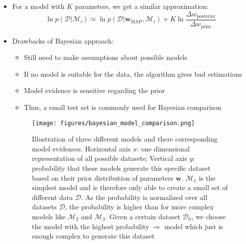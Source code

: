\begin{itemize}
	 \item For a model with $K$ parameters, we get a similar approximation: 
	 $$\ln p\left(\mathcal{D}|\mathcal{M}_i\right) \simeq \ln p\left(\mathcal{D}|\bm{w}_{\text{MAP}}, \mathcal{M}_i\right) + K \ln \frac{\Delta w_{\text{posterior}}}{\Delta w_{\text{prior}}}$$
	 \item Drawbacks of Bayesian approach:
	 \begin{itemize}
	 	\item Still need to make assumptions about possible models
	 	\item If no model is suitable for the data, the algorithm gives bad estimations
	 	\item Model evidence is sensitive regarding the prior
	 	\item Thus, a small test set is commonly used for Bayesian comparison
	 \end{itemize}
	 \begin{figure}[ht]
	 	\centering
	 	\texttt{[image: figures/bayesian\_model\_comparison.png]}
	 	\caption{Illustration of three different models and there corresponding model evidences. Horizontal axis $x$: one dimensional representation of all possible datasets; Vertical axis $y$: probability that these models generate this specific dataset based on their prior distribution of parameters $\bm{w}$. $\mathcal{M}_1$ is the simplest model and is therefore only able to create a small set of different data $\mathcal{D}$. As the probability is normalized over all datasets $\mathcal{D}$, the probability is higher than for more complex models like $\mathcal{M}_2$ and $\mathcal{M}_3$. Given a certain dataset $\mathcal{D}_0$, we choose the model with the highest probability $\Rightarrow$ model which just is enough complex to generate this dataset}
	 \end{figure}
 	
\end{itemize}
